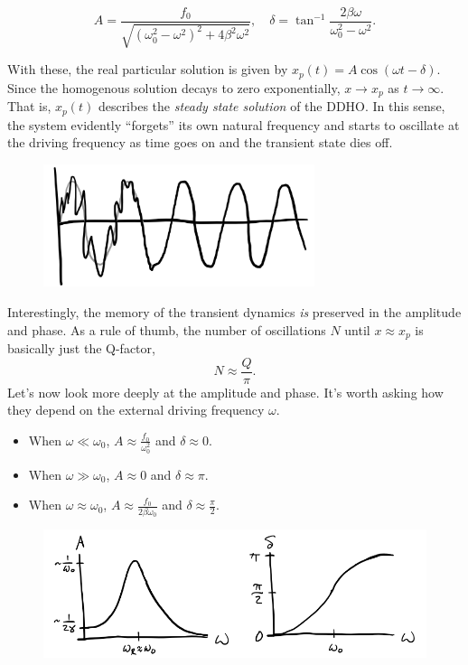 \documentclass[
  letterpaper,
  DIV=11,
  numbers=noendperiod]{scrreprt}
\providecommand{\tightlist}{%
  \setlength{\itemsep}{0pt}\setlength{\parskip}{0pt}}\usepackage{longtable,booktabs,array}
\begin{document}
\[
A = \frac{f_0}{\sqrt{(\omega_0^2-\omega^2)^2 + 4\beta^2\omega^2}}, \quad \delta = \tan^{-1} \frac{2\beta\omega}{\omega_0^2-\omega^2}.
\]

With these, the real particular solution is given by
\(x_p(t) = A \cos(\omega t - \delta)\). Since the homogenous solution
decays to zero exponentially, \(x \rightarrow x_p\) as
\(t \rightarrow \infty\). That is, \(x_p(t)\) describes the \emph{steady
state solution} of the DDHO. In this sense, the system evidently
``forgets'' its own natural frequency and starts to oscillate at the
driving frequency as time goes on and the transient state dies off.

\begin{figure}

{\centering \includegraphics[width=3.125in,height=\textheight]{classical-mechanics/./resources/image-20230215142723690.png}

}

\end{figure}

Interestingly, the memory of the transient dynamics \emph{is} preserved
in the amplitude and phase. As a rule of thumb, the number of
oscillations \(N\) until \(x \approx x_p\) is basically just the
Q-factor, \[
N \approx \frac{Q}{\pi}.
\] Let's now look more deeply at the amplitude and phase. It's worth
asking how they depend on the external driving frequency \(\omega\).

\begin{itemize}
\tightlist
\item
  When \(\omega \ll \omega_0\), \(A \approx \frac{f_0}{\omega_0^2}\) and
  \(\delta \approx 0\).
\item
  When \(\omega \gg \omega_0\), \(A \approx 0\) and
  \(\delta \approx \pi\).
\item
  When \(\omega \approx \omega_0\),
  \(A \approx \frac{f_0}{2\beta\omega_0}\) and
  \(\delta \approx \frac{\pi}{2}\).
\end{itemize}

\begin{figure}

{\centering \includegraphics[width=5.20833in,height=\textheight]{classical-mechanics/./resources/image-20230215145247903.png}

}

\end{figure}
\end{document}

